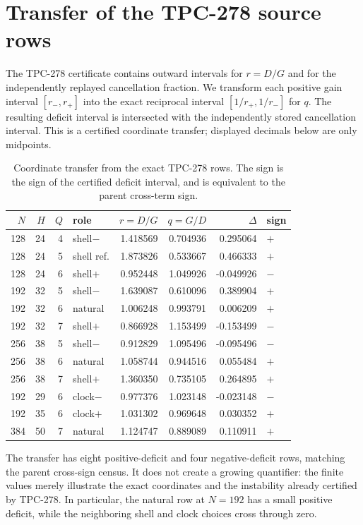 \documentclass[11pt]{article}
\begin{document}
\section{Transfer of the TPC-278 source rows}

The TPC-278 certificate contains outward intervals for $r=D/G$ and for the
independently replayed cancellation fraction.  We transform each positive
gain interval $[r_-,r_+]$ into the exact reciprocal interval
$[1/r_+,1/r_-]$ for $q$.  The resulting deficit interval is intersected
with the independently stored cancellation interval.  This is a certified
coordinate transfer; displayed decimals below are only midpoints.

\begin{table}[ht]
\centering
\scriptsize
\begin{tabular}{r r r l r r r l}
\toprule
$N$ & $H$ & $Q$ & role & $r=D/G$ & $q=G/D$ & $\Delta$ & sign\\
\midrule
128 & 24 & 4 & shell$-$ & 1.418569 & 0.704936 & 0.295064 & $+$\\
128 & 24 & 5 & shell ref. & 1.873826 & 0.533667 & 0.466333 & $+$\\
128 & 24 & 6 & shell$+$ & 0.952448 & 1.049926 & -0.049926 & $-$\\
192 & 32 & 5 & shell$-$ & 1.639087 & 0.610096 & 0.389904 & $+$\\
192 & 32 & 6 & natural & 1.006248 & 0.993791 & 0.006209 & $+$\\
192 & 32 & 7 & shell$+$ & 0.866928 & 1.153499 & -0.153499 & $-$\\
256 & 38 & 5 & shell$-$ & 0.912829 & 1.095496 & -0.095496 & $-$\\
256 & 38 & 6 & natural & 1.058744 & 0.944516 & 0.055484 & $+$\\
256 & 38 & 7 & shell$+$ & 1.360350 & 0.735105 & 0.264895 & $+$\\
192 & 29 & 6 & clock$-$ & 0.977376 & 1.023148 & -0.023148 & $-$\\
192 & 35 & 6 & clock$+$ & 1.031302 & 0.969648 & 0.030352 & $+$\\
384 & 50 & 7 & natural & 1.124747 & 0.889089 & 0.110911 & $+$\\
\bottomrule
\end{tabular}
\caption{Coordinate transfer from the exact TPC-278 rows.  The sign is the
sign of the certified deficit interval, and is equivalent to the parent
cross-term sign.}
\end{table}

The transfer has eight positive-deficit and four negative-deficit rows,
matching the parent cross-sign census.  It does not create a growing
quantifier: the finite values merely illustrate the exact coordinates and
the instability already certified by TPC-278.  In particular, the natural
row at $N=192$ has a small positive deficit, while the neighboring shell and
clock choices cross through zero.
\end{document}
